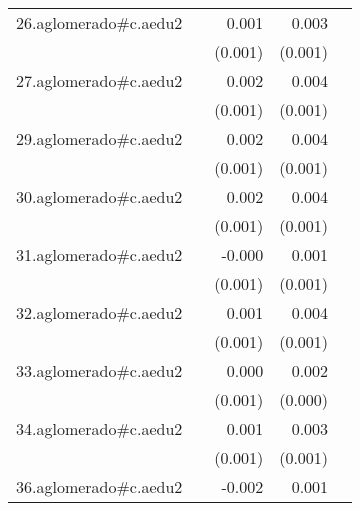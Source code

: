 {\begin{longtable}{l*{4}{D{.}{.}{-1}}}
\addlinespace
26.aglomerado#c.aedu2&                     &       0.001         &       0.003\sym{***}&                     \\
            &                     &     (0.001)         &     (0.001)         &                     \\
\addlinespace
27.aglomerado#c.aedu2&                     &       0.002         &       0.004\sym{***}&                     \\
            &                     &     (0.001)         &     (0.001)         &                     \\
\addlinespace
29.aglomerado#c.aedu2&                     &       0.002         &       0.004\sym{***}&                     \\
            &                     &     (0.001)         &     (0.001)         &                     \\
\addlinespace
30.aglomerado#c.aedu2&                     &       0.002         &       0.004\sym{***}&                     \\
            &                     &     (0.001)         &     (0.001)         &                     \\
\addlinespace
31.aglomerado#c.aedu2&                     &      -0.000         &       0.001         &                     \\
            &                     &     (0.001)         &     (0.001)         &                     \\
\addlinespace
32.aglomerado#c.aedu2&                     &       0.001         &       0.004\sym{***}&                     \\
            &                     &     (0.001)         &     (0.001)         &                     \\
\addlinespace
33.aglomerado#c.aedu2&                     &       0.000         &       0.002\sym{***}&                     \\
            &                     &     (0.001)         &     (0.000)         &                     \\
\addlinespace
34.aglomerado#c.aedu2&                     &       0.001         &       0.003\sym{***}&                     \\
            &                     &     (0.001)         &     (0.001)         &                     \\
\addlinespace
36.aglomerado#c.aedu2&                     &      -0.002         &       0.001         &                     \\

\end{longtable}}
